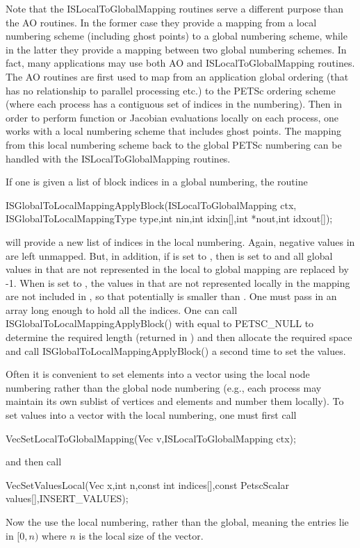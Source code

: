Note that the ISLocalToGlobalMapping routines serve a different purpose
than the AO routines. In the former case they provide a mapping
from  a local numbering scheme (including ghost points) to a global numbering scheme,
while in the latter they provide a mapping between two global numbering schemes.
In fact, many applications may use both AO and ISLocalToGlobalMapping routines.
The AO routines are first used to map from an application global ordering
(that has no relationship to parallel processing etc.) to the PETSc ordering scheme
(where each process has a contiguous set of indices in the numbering). Then in order
to perform function or Jacobian evaluations locally on each process, one works
with a local numbering scheme that includes ghost points.  The mapping from this local
numbering scheme back to the global PETSc numbering can be handled with the
ISLocalToGlobalMapping routines.

If one is given a list of block indices in a global numbering, the routine
\begin{tabbing}
  ISGlobalToLocalMappingApplyBlock(ISLocalToGlobalMapping ctx,\\
                              ISGlobalToLocalMappingType type,int nin,int idxin[],int *nout,int idxout[]);
\end{tabbing}
 will provide
a new list of indices in the local numbering. Again, negative values in
 are left unmapped.  But, in addition, if  is set to
,
then  is set to  and all global values
in  that are not represented in the local to global mapping
are replaced by -1. When  is set to ,
 the values in  that are not
represented locally in the mapping are not included in , so that
potentially  is smaller than .  One must
pass in an array long enough to hold all the indices. One can call
ISGlobalToLocalMappingApplyBlock() with  equal to
PETSC\_NULL to determine the required length (returned in
) and then allocate the required space and call
ISGlobalToLocalMappingApplyBlock() a second time to set the values.

Often it is convenient to set elements into a vector using the local node
numbering rather than the global node numbering (e.g.,  each process may
maintain its own sublist of vertices and elements and number them locally).
To set values into a vector with the local numbering, one must first call
\begin{tabbing}
  VecSetLocalToGlobalMapping(Vec v,ISLocalToGlobalMapping ctx);
\end{tabbing}
and then call
\begin{tabbing}
  VecSetValuesLocal(Vec x,int n,const int indices[],const PetscScalar values[],INSERT\_VALUES);
\end{tabbing}
Now the  use the local numbering, rather than the global, meaning
the entries lie in $[0,n)$ where $n$ is the local size of the vector.


